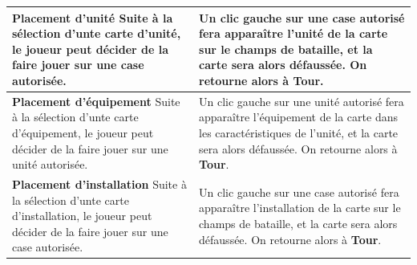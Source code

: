\begin{tabularx}{15 cm}{|X|X|}
\hline
\textbf{Placement d'unité} \newline Suite à la sélection d'unte carte d'unité, le joueur peut décider de la faire jouer sur une case autorisée. & Un clic gauche sur une case autorisé fera apparaître l'unité de la carte sur le champs de bataille, et la carte sera alors défaussée. On retourne alors à \textbf{Tour}. \\
\hline

\textbf{Placement d'équipement} \newline Suite à la sélection d'unte carte d'équipement, le joueur peut décider de la faire jouer sur une unité autorisée. & Un clic gauche sur une unité autorisé fera apparaître l'équipement de la carte dans les caractéristiques de l'unité, et la carte sera alors défaussée. On retourne alors à \textbf{Tour}. \\
\hline

\textbf{Placement d'installation} \newline Suite à la sélection d'unte carte d'installation, le joueur peut décider de la faire jouer sur une case autorisée. & Un clic gauche sur une case autorisé fera apparaître l'installation de la carte sur le champs de bataille, et la carte sera alors défaussée. On retourne alors à \textbf{Tour}. \\
\hline

\end{tabularx}

